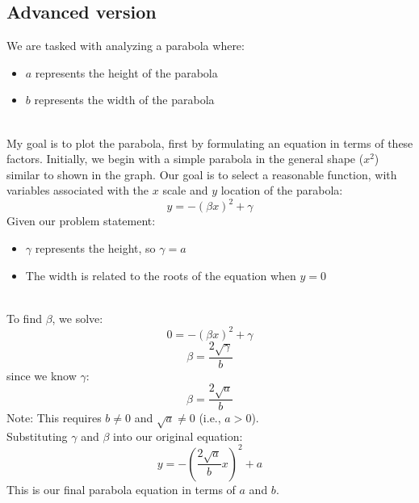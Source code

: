 \documentclass[a4paper, 12pt]{report}
\begin{document}
    
    
    \subsection{Advanced version}
    We are tasked with analyzing a parabola where:\\
    \vspace{1em}
    \hspace{3.8em}
    \begin{minipage}{0.6\textwidth}\centering
    \begin{itemize}[itemsep=-0.1cm]
        \item $a$ represents the height of the parabola
        \item $b$ represents the width of the parabola
    \end{itemize}
    \end{minipage}\\
    \vspace*{1em}
    My goal is to plot the parabola, first by formulating an equation in terms of these factors. Initially, we begin with a simple parabola in the general shape ($x^2$) similar to shown in the graph. Our goal is to select a reasonable function, with variables associated with the $x$ scale and $y$ location of the parabola:    
    \[y = -(\beta x)^2 + \gamma\]
    Given our problem statement:\\
    \vspace{1em}
    \hspace{3.8em}
    \begin{minipage}{0.8\textwidth}\centering
       \begin{itemize}[itemsep=-0.1cm]
        \item $\gamma$ represents the height, so $\gamma = a$
        \item The width is related to the roots of the equation when $y = 0$
    \end{itemize}
    \end{minipage}\\
    \vspace{1em}
    To find $\beta$, we solve:
    \[0 = -(\beta x)^2 + \gamma\]
    \[\beta = \frac{2\sqrt{\gamma}}{b}\]
    since we know $\gamma$:
    \[\beta = \frac{2\sqrt{a}}{b}\]
    Note: This requires $b \neq 0$ and $\sqrt{a} \neq 0$ (i.e., $a > 0$).\\
    Substituting $\gamma$ and $\beta$ into our original equation:
    \[\boxed{y = -\left(\frac{2\sqrt{a}}{b}x\right)^2 + a}\]
    This is our final parabola equation in terms of $a$ and $b$.
\end{document}

